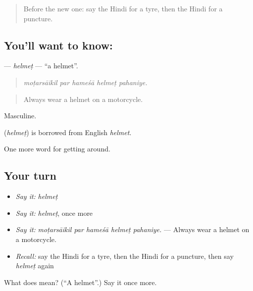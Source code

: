 \begin{quote}
Before the new one: say the Hindi for a tyre, then the Hindi for a puncture.
\end{quote}

\subsection*{You'll want to know: }
\textbf{} — \emph{helmeṭ} — \textquotedblleft{}a helmet\textquotedblright{}.

\begin{quote}
    
\end{quote}

\begin{quote}
\emph{moṭarsāikil par hameśā helmeṭ pahaniye.}
\end{quote}

\begin{quote}
Always wear a helmet on a motorcycle.
\end{quote}

Masculine.

\begin{cousinweb}
\textbf{} (\emph{helmeṭ}) is borrowed from English \emph{helmet}.
\end{cousinweb}

\begin{grammarlens}[title={What you've built}]
One more word for getting around.
\end{grammarlens}

\subsection*{Your turn}
\begin{itemize}
\raggedright
  \item \emph{Say it:} \emph{helmeṭ}
  \item \emph{Say it:} \emph{helmeṭ}, once more
  \item \emph{Say it:} \emph{moṭarsāikil par hameśā helmeṭ pahaniye.} — Always wear a helmet on a motorcycle.
  \item \emph{Recall:} say the Hindi for a tyre, then the Hindi for a puncture, then say \emph{helmeṭ} again
\end{itemize}

\begin{tcolorbox}[breakable,colback=teal!4,colframe=teal!35!black,title={Before you move on}]
What does  mean? (\textquotedblleft{}A helmet\textquotedblright{}.) Say it once more.
\end{tcolorbox}
